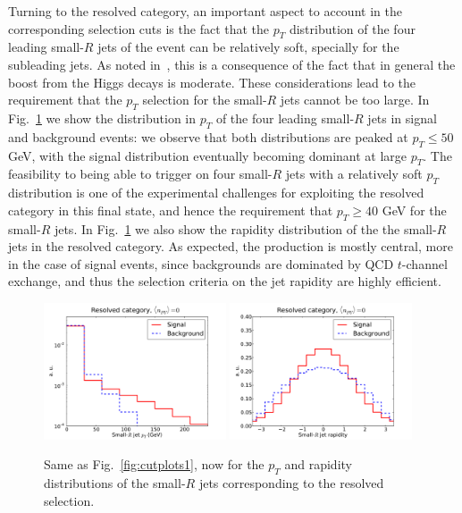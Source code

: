 Turning to the resolved category, an important aspect to account
in the corresponding selection
cuts is the fact that the $p_T$ distribution
of the four leading small-$R$ jets of the event can be relatively soft,
specially for the subleading jets.
%
As noted in~\cite{deLima:2014dta}, this is a consequence of the fact
that in general the boost from the Higgs decays is moderate.
%
These considerations lead to the requirement that the $p_T$
selection
for the small-$R$ jets cannot be too large.
%
In Fig.~\ref{fig:cutplots23}
we show the distribution in $p_T$ of the four leading
small-$R$ jets in signal and background events: we observe that both
distributions are peaked at $p_T \le 50$ GeV, with the signal distribution
eventually becoming dominant at large $p_T$.
%
The feasibility to being able to trigger on four small-$R$ jets with a relatively
soft $p_T$ distribution is one of the experimental challenges for
exploiting the resolved category in this final state,
and hence the requirement that $p_T \ge 40$ GeV for
the small-$R$ jets.
%
In  Fig.~\ref{fig:cutplots23} we also show the
rapidity distribution of the the small-$R$
jets in the resolved category.
%
As expected, the production
is mostly central, more in the case
of signal events, since backgrounds are dominated by
QCD $t$-channel exchange, and thus the
selection criteria on the jet rapidity  are highly efficient.


\begin{figure}[t]
\begin{center}
 \includegraphics[width=0.48\textwidth]{plots/pt_smallRjets_res_noPU.pdf}
 \includegraphics[width=0.48\textwidth]{plots/eta_smallRjets_res_noPU.pdf}
 \caption{\small Same as Fig.~\ref{fig:cutplots1}, now for the
   $p_T$ and rapidity distributions of the small-$R$
   jets corresponding to the resolved selection.
}
\label{fig:cutplots23}
\end{center}
\end{figure}

